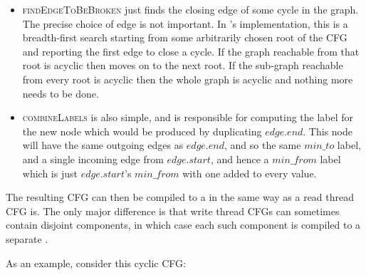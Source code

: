 \begin{itemize}
\item \textsc{findEdgeToBeBroken} just finds the closing edge of some
  cycle in the graph.  The precise choice of edge is not
  important.  In {\implementation}'s implementation, this is a
  breadth-first search starting from some arbitrarily chosen root of
  the CFG and reporting the first edge to close a cycle.  If the graph
  reachable from that root is acyclic then {\implementation} moves on
  to the next root.  If the sub-graph reachable from every root is
  acyclic then the whole graph is acyclic and nothing more needs to be
  done.
\item \textsc{combineLabels} is also simple, and is responsible for
  computing the label for the new node which would be produced by
  duplicating $\mathit{edge}.\mathit{end}$.  This node will have the
  same outgoing edges as $\mathit{edge}.\mathit{end}$, and so the same
  $min\_to$ label, and a single incoming edge from
  $\mathit{edge}.\mathit{start}$, and hence a $\mathit{min\_from}$
  label which is just $\mathit{edge}.\mathit{start}$'s
  $\mathit{min\_from}$ with one added to every value.
\end{itemize}

The resulting CFG can then be compiled to a {\StateMachine} in the
same way as a read thread CFG is.  The only major difference is that
write thread CFGs can sometimes contain disjoint components, in which
case each such component is compiled to a separate {\StateMachine}.

As an example, consider this cyclic CFG:


